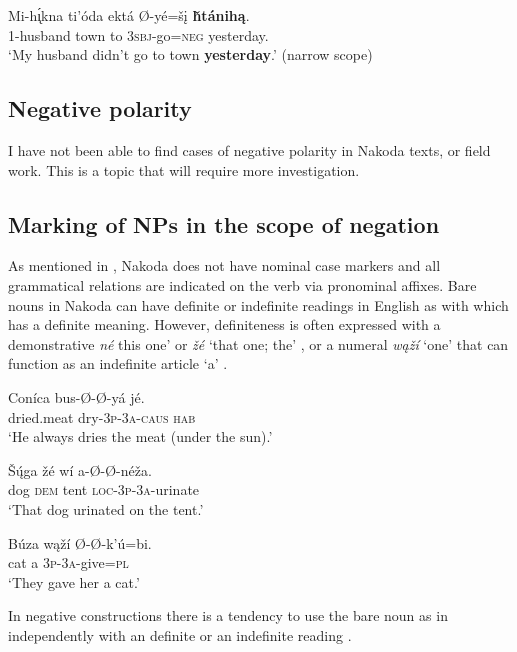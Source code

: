 \documentclass[output=paper,colorlinks,citecolor=brown]{langscibook}
\begin{document}
    \ex\label{ex:nak:62b}
        \gll Mi-h\'{\k{ı}}kna ti’óda ektá Ø-yé=šį \textbf{ȟtánihą}. \\
             1-husband town to \textsc{3sbj}-go=\textsc{neg} yesterday. \\
        \glt ‘My husband didn’t go to town \textbf{yesterday}.’ (narrow scope)
    \z
\z 

\subsection{Negative polarity}

I have not been able to find cases of negative polarity in Nakoda texts, or field work. This is a topic that will require more investigation.


\subsection{Marking of NPs in the scope of negation}\label{sec:nak:4.2}

As mentioned in , Nakoda does not have nominal case markers and all grammatical relations are indicated on the verb via pronominal affixes. Bare nouns in Nakoda can have definite or indefinite readings in English as with  which has a definite meaning. However, definiteness is often expressed with a demonstrative \textit{né} this one’ or \textit{žé} ‘that one; the’ , or a numeral \textit{wąží} ‘one’ that can function as an indefinite article ‘a’ .

\ea\label{ex:nak:63}
    \gll Coníca bus-Ø-Ø-yá jé. \\ 
         dried.meat dry-\textsc{3p-3a-caus} \textsc{hab} \\
    \glt ‘He always dries the meat (under the sun).’
\z 

\ea\label{ex:nak:64}
    \gll Š\'{ų}ga žé wí a-Ø-Ø-néža. \\
         dog \textsc{dem} tent \textsc{loc-3p-3a}-urinate \\
    \glt ‘That dog urinated on the tent.’ 
\z 

\ea\label{ex:nak:65}
    \gll Búza wąží Ø-Ø-k’ú=bi. \\ 
         cat a \textsc{3p-3a}-give=\textsc{pl} \\
    \glt ‘They gave her a cat.’
\z 

In negative constructions there is a tendency to use the bare noun as in  independently with an definite  or an indefinite reading .
\end{document}
